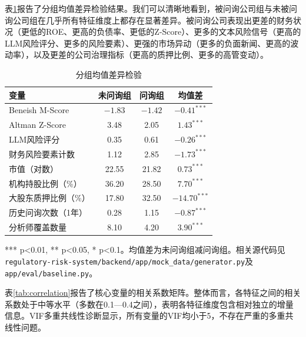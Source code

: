 表\ref{tab:comparison}报告了分组均值差异检验结果。我们可以清晰地看到，被问询公司组与未被问询公司组在几乎所有特征维度上都存在显著差异。被问询公司表现出更差的财务状况（更低的ROE、更高的负债率、更低的Z-Score）、更多的文本风险信号（更高的LLM风险评分、更多的风险要素）、更强的市场异动（更多的负面新闻、更高的波动率），以及更差的公司治理指标（更高的质押比例、更多的高管变动）。

\begin{table}[H]
\centering
\caption{分组均值差异检验}
\label{tab:comparison}
\begin{threeparttable}
\begin{tabular}{lccc}
\toprule
变量 & 未问询组 & 问询组 & 均值差 \\
\midrule
Beneish M-Score & $-1.83$ & $-1.42$ & $-0.41^{***}$ \\
Altman Z-Score & 3.48 & 2.05 & $1.43^{***}$ \\
LLM风险评分 & 0.35 & 0.61 & $-0.26^{***}$ \\
财务风险要素计数 & 1.12 & 2.85 & $-1.73^{***}$ \\
市值（对数） & 22.55 & 21.82 & $0.73^{***}$ \\
机构持股比例（\%） & 36.20 & 28.50 & $7.70^{***}$ \\
大股东质押比例（\%） & 17.80 & 32.50 & $-14.70^{***}$ \\
历史问询次数（1年） & 0.28 & 1.15 & $-0.87^{***}$ \\
分析师覆盖数量 & 8.10 & 4.20 & $3.90^{***}$ \\
\bottomrule
\end{tabular}
\begin{tablenotes}
\item[注] *** p<0.01, ** p<0.05, * p<0.1。均值差为未问询组减问询组。相关源代码见\texttt{regulatory-risk-system/backend/app/mock\_data/generator.py}及\texttt{app/eval/baseline.py}。
\end{tablenotes}
\end{threeparttable}
\end{table}

表\ref{tab:correlation}报告了核心变量的相关系数矩阵。整体而言，各特征之间的相关系数处于中等水平（多数在0.1—0.4之间），表明各特征维度包含相对独立的增量信息。VIF多重共线性诊断显示，所有变量的VIF均小于5，不存在严重的多重共线性问题。


